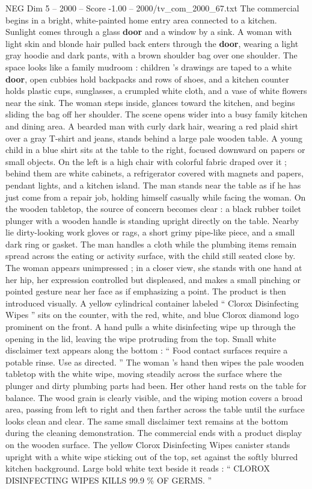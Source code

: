 \begin{textsample}{NEG Dim 5 – 2000 – Score -1.00 – 2000/tv\_com\_2000\_67.txt}  \label{ex:f5_neg_077}
The commercial begins in a bright, white-painted home entry area connected to a kitchen.
Sunlight comes through a glass \textbf{door} and a window by a sink.
A woman with light skin and blonde hair pulled back enters through the \textbf{door}, wearing a light gray hoodie and dark pants, with a brown shoulder bag over one shoulder.
The space looks like a family mudroom : children ’s drawings are taped to a white \textbf{door}, open cubbies hold backpacks and rows of shoes, and a kitchen counter holds plastic cups, sunglasses, a crumpled white cloth, and a vase of white flowers near the sink.
The woman steps inside, glances toward the kitchen, and begins sliding the bag off her shoulder.
The scene opens wider into a busy family kitchen and dining area.
A bearded man with curly dark hair, wearing a red plaid shirt over a gray T-shirt and jeans, stands behind a large pale wooden table.
A young child in a blue shirt sits at the table to the right, focused downward on papers or small objects.
On the left is a high chair with colorful fabric draped over it ; behind them are white cabinets, a refrigerator covered with magnets and papers, pendant lights, and a kitchen island.
The man stands near the table as if he has just come from a repair job, holding himself casually while facing the woman.
On the wooden tabletop, the source of concern becomes clear : a black rubber toilet plunger with a wooden handle is standing upright directly on the table.
Nearby lie dirty-looking work gloves or rags, a short grimy pipe-like piece, and a small dark ring or gasket.
The man handles a cloth while the plumbing items remain spread across the eating or activity surface, with the child still seated close by.
The woman appears unimpressed ; in a closer view, she stands with one hand at her hip, her expression controlled but displeased, and makes a small pinching or pointed gesture near her face as if emphasizing a point.
The product is then introduced visually.
A yellow cylindrical container labeled “ Clorox Disinfecting Wipes ” sits on the counter, with the red, white, and blue Clorox diamond logo prominent on the front.
A hand pulls a white disinfecting wipe up through the opening in the lid, leaving the wipe protruding from the top.
Small white disclaimer text appears along the bottom : “ Food contact surfaces require a potable rinse.
Use as directed. ” The woman ’s hand then wipes the pale wooden tabletop with the white wipe, moving steadily across the surface where the plunger and dirty plumbing parts had been.
Her other hand rests on the table for balance.
The wood grain is clearly visible, and the wiping motion covers a broad area, passing from left to right and then farther across the table until the surface looks clean and clear.
The same small disclaimer text remains at the bottom during the cleaning demonstration.
The commercial ends with a product display on the wooden surface.
The yellow Clorox Disinfecting Wipes canister stands upright with a white wipe sticking out of the top, set against the softly blurred kitchen background.
Large bold white text beside it reads : “ CLOROX DISINFECTING WIPES KILLS 99.9 \% OF GERMS. ”

\end{textsample}
